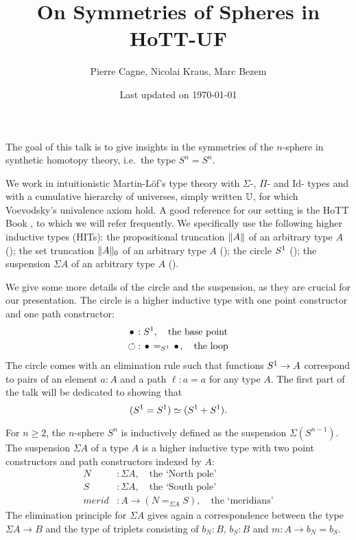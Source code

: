 \documentclass[english,a4]{article}
\title{{On Symmetries of Spheres in HoTT-UF}}%
\author{\normalsize Pierre Cagne, Nicolai Kraus, Marc Bezem} %
\date{\normalsize Last updated on \today}%
\newcommand{\mrd}{\mathit{merid}}%
\newcommand{\susp}[1]{\Sigma{#1}}%
\def\U{\universe U}%
\begin{document}
\maketitle

The goal of this talk is to give insights in the symmetries of the
$n$-sphere in synthetic homotopy theory, i.e.\ the type $S^n = S^n$.

We work in intuitionistic Martin-Löf's type theory with $\Sigma$-,
$\Pi$- and $\mathrm{Id}$- types and with a cumulative hierarchy of
universes, simply written $\U$, for which Voevodsky's univalence axiom
hold.  A good reference for our setting is the HoTT Book \cite{HoTT},
to which we will refer frequently. We specifically use the following
higher inductive types (HITs): the propositional truncation
$\lVert A\rVert$ of an arbitrary type $A$ (\cite[Ch.~3.7]{HoTT}); the set
truncation $\lVert A\rVert_0$ of an arbitrary type $A$
(\cite[Ch.~6.9]{HoTT}); the circle ${S^1}$ (\cite[Ch.~6.4]{HoTT}); the
suspension $\susp A$ of an arbitrary type $A$ (\cite[Ch.~6.5]{HoTT}).


We give some more details of the circle and the suspension, as they
are crucial for our presentation. The circle is a higher inductive
type with one point constructor and one path constructor:
\begin{align*}
  \base &: \Sc,  \quad\text{the base point}\\
  \Sloop &: \base =_{\Sc} \base,  \quad\text{the loop}
\end{align*}
The circle comes with an elimination rule such that functions
${S^1} \to A$ correspond to pairs of an element $a:A$ and a path
$\ell: a=a$ for any type $A$. The first part of the talk will be
dedicated to showing that
\begin{equation}
  \label{eq:s1-result}%
  (\Sc = \Sc) \weq (\Sc+\Sc).
\end{equation}

For $n\geq 2$, the $n$-sphere $S^n$ is inductively defined as the
suspension $\susp {(S^{n-1})}$. The suspension $\susp A$ of a type $A$
is a higher inductive type with two point constructors and path
constructors indexed by $A$:
\begin{align*}
  \label{eq:suspension}
  N &: \susp A, \quad\text{the `North pole'}\\
  S &: \susp A, \quad\text{the `South pole'}\\
  \mrd &: A \to (N =_{\susp A} S), \quad\text{the `meridians'}
\end{align*}
The elimination principle for $\susp A$ gives again a correspondence
between the type $\susp A \to B$ and the type of triplets consisting
of $b_N: B$, $b_S: B$ and $m: A \to b_N=b_S$.
\end{document}
